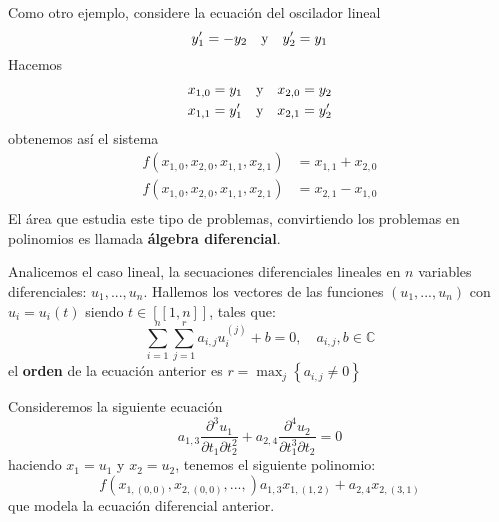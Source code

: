 \documentclass[12pt]{report}
\theoremstyle{largebreak}
\newcommand\natint[1]{\ensuremath{\left[\!\left[ #1\right]\!\right]}}
\begin{document}
    Como otro ejemplo, considere la ecuación del oscilador lineal
    \begin{equation*}
        y_1'=-y_2\quad\textup{y}\quad y_2'=y_1
    \end{equation*}
    Hacemos
    \begin{equation*}
        \begin{split}
            x_{ 1,0}=y_1\quad&\textup{y}\quad x_{ 2,0}=y_2\\
            x_{ 1,1}=y_1'\quad&\textup{y}\quad x_{ 2,1}=y_2'\\
        \end{split}
    \end{equation*}
    obtenemos así el sistema
    \begin{equation*}
        \begin{split}
            f(x_{ 1,0},x_{ 2,0},x_{ 1,1},x_{ 2,1})&=x_{ 1,1}+x_{2,0}\\
            f(x_{ 1,0},x_{ 2,0},x_{ 1,1},x_{ 2,1})&=x_{ 2,1}-x_{1,0}\\
        \end{split}
    \end{equation*}
    El área que estudia este tipo de problemas, convirtiendo los problemas en polinomios es llamada \textbf{álgebra diferencial}.

    Analicemos el caso lineal, la secuaciones diferenciales lineales en $n$ variables diferenciales: $u_1,...,u_n$. Hallemos los vectores de las funciones $(u_1,...,u_n)$ con $u_i=u_i(t)$ siendo $t\in\natint{1,n}$, tales que:
    \begin{equation*}
        \sum_{ i=1}^n\sum_{ j=1}^r a_{ i,j}u_i^{(j)}+b=0,\quad a_{ i,j},b\in\mathbb{C}
    \end{equation*}
    el \textbf{orden} de la ecuación anterior es $r=\max_{ j}\left\{a_{ i,j}\neq0 \right\}$

    \begin{exa}
        Consideremos la siguiente ecuación
        \begin{equation*}
            a_{ 1,3}\frac{\partial^3u_1}{\partial t_1\partial t_2^2}+a_{ 2,4}\frac{\partial^4u_2}{\partial t_1^3\partial t_2}=0
        \end{equation*}
        haciendo $x_1=u_1$ y $x_2=u_2$, tenemos el siguiente polinomio:
        \begin{equation*}
            f(x_{1,(0,0)},x_{2,(0,0)},...,)a_{1,3}x_{ 1,(1,2)}+a_{2,4}x_{ 2,(3,1)}
        \end{equation*}
        que modela la ecuación diferencial anterior.
    \end{exa}
\end{document}
